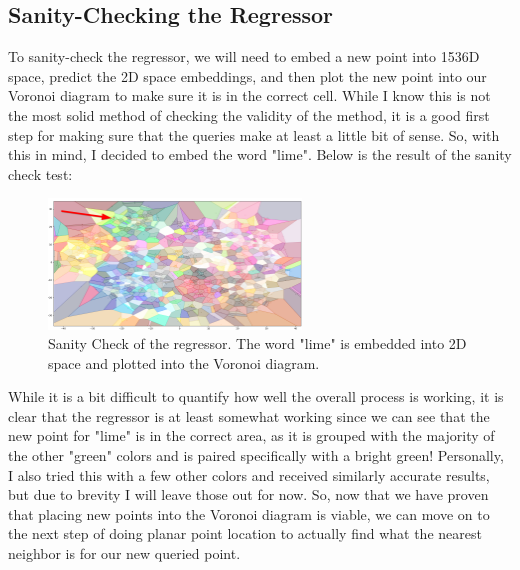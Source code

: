 \documentclass{article}
\begin{document}
\subsection{Sanity-Checking the Regressor}
To sanity-check the regressor, we will need to embed a new point into 1536D space,
predict the 2D space embeddings, and then plot the new point into our Voronoi diagram
to make sure it is in the correct cell. While I know this is not the most solid
method of checking the validity of the method, it is a good first step for making
sure that the queries make at least a little bit of sense. So, with this in mind,
I decided to embed the word "lime". Below is the result of the sanity check test:

\begin{figure}[H]
\centering
\includegraphics[width=0.6\textwidth]{images/query_sanity_check.png}
\caption{Sanity Check of the regressor. The word "lime" is embedded into 2D space and plotted into the Voronoi diagram.}
\label{fig:sanitycheck}
\end{figure}

\noindent
While it is a bit difficult to quantify how well the overall process is
working, it is clear that the regressor is at least somewhat working since
we can see that the new point for "lime" is in the correct area, as it is 
grouped with the majority of the other "green" colors and is paired 
specifically with a bright green! Personally, I also tried this with a few
other colors and received similarly accurate results, but due to brevity
I will leave those out for now. So, now that we have proven that placing 
new points into the Voronoi diagram is viable, we can move on to the next
step of doing planar point location to actually find what the nearest 
neighbor is for our new queried point.
\end{document}
